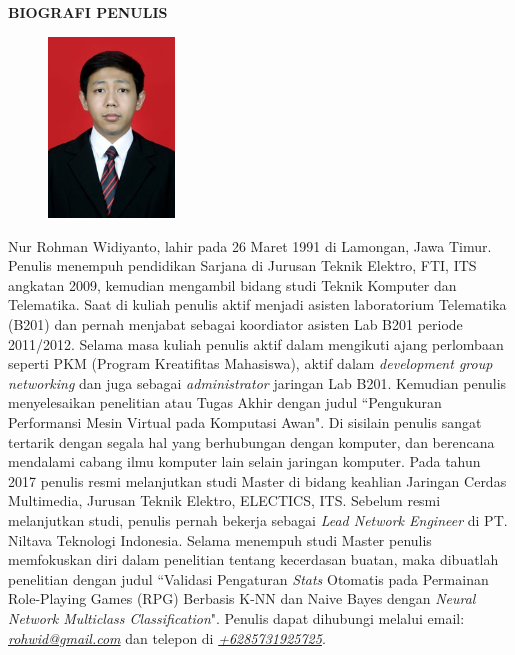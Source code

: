 \begin{center}
\Large\textbf{BIOGRAFI PENULIS}
\end{center}
\vspace{1ex}

\begin{figure}
	\centering
	\vspace{-3ex}	
	\includegraphics[width=0.3\textwidth]{img/aku.jpg}
	\vspace{-4ex}
\end{figure}

\noindent Nur Rohman Widiyanto, lahir pada 26 Maret 1991 di Lamongan, Jawa Timur.
Penulis menempuh pendidikan Sarjana di Jurusan Teknik Elektro, FTI, ITS angkatan 2009, kemudian mengambil bidang studi Teknik Komputer dan Telematika. Saat di kuliah penulis aktif menjadi asisten laboratorium Telematika (B201) dan pernah menjabat sebagai koordiator asisten Lab B201 periode 2011/2012. Selama masa kuliah penulis aktif dalam mengikuti ajang perlombaan seperti PKM (Program Kreatifitas Mahasiswa), aktif dalam \textit{development group networking} dan juga sebagai \textit{administrator} jaringan Lab B201. Kemudian penulis menyelesaikan penelitian atau Tugas Akhir dengan judul ``Pengukuran Performansi Mesin Virtual pada Komputasi Awan". Di sisilain penulis sangat tertarik dengan segala hal yang berhubungan dengan komputer, dan berencana mendalami cabang ilmu komputer lain selain jaringan komputer. Pada tahun 2017 penulis resmi melanjutkan studi Master di bidang keahlian Jaringan Cerdas Multimedia, Jurusan Teknik Elektro, ELECTICS, ITS. Sebelum resmi melanjutkan studi, penulis pernah bekerja sebagai \textit{Lead Network Engineer} di PT. Niltava Teknologi Indonesia. Selama menempuh studi Master penulis memfokuskan diri dalam penelitian tentang kecerdasan buatan, maka dibuatlah penelitian dengan judul ``Validasi Pengaturan \textit{Stats} Otomatis pada Permainan Role-Playing Games (RPG) Berbasis K-NN dan Naive Bayes dengan \textit{Neural Network Multiclass Classification}". Penulis dapat dihubungi melalui email: \underline{\textit{rohwid@gmail.com}} dan telepon di \underline{\textit{+6285731925725}}.